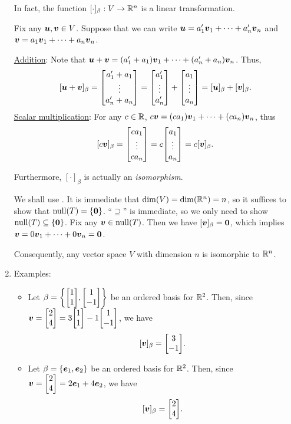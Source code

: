 \begin{enumerate}
In fact, the function \([\cdot]_{\beta}:V\to\mathbb{R}^n\) is a linear transformation.

\begin{pf}
Fix any \(\vb*{u},\vb*{v}\in V\). Suppose that we can write
\(\vb*{u}=a_1'\vb*{v}_1+\dotsb+a_n'\vb*{v}_n\) and
\(\vb*{v}=a_1\vb*{v}_1+\dotsb+a_n\vb*{v}_n\).

\underline{Addition}: Note that
\(\vb*{u}+\vb*{v}=(a_1'+a_1)\vb*{v}_1+\dotsb+(a_n'+a_n)\vb*{v}_n\). Thus,
\[
[\vect{u}+\vect{v}]_{\beta}
=\mqty[
a_1'+a_1\\
\vdots\\
a_n'+a_n
]
=\mqty[
a_1'\\ \vdots\\ a_n'
]
+\mqty[
a_1\\ \vdots\\ a_n
]
=[\vect{u}]_{\beta}+[\vect{v}]_{\beta}.
\]
\underline{Scalar multiplication}: For any \(c\in\mathbb{R}\),
\(c\vb*{v}=(ca_1)\vb*{v}_1+\dotsb+(ca_n)\vb*{v}_n\), thus
\[
[c\vect{v}]_{\beta}=\mqty[ca_1\\ \vdots\\ ca_n]=c\mqty[a_1\\ \vdots\\ a_n]=c[\vect{v}]_{\beta}.
\]
\end{pf}

Furthermore, \([\cdot]_{\beta}\) is actually an
\emph{isomorphism}.

\begin{pf}
We shall use . It is immediate that
\(\dim(V)=\dim(\mathbb{R}^n)=n\), so it suffices to show that \(\operatorname{null}(T)=\{\vb*{0}\}\).
``\(\supseteq\)'' is immediate, so we only need to show \(\operatorname{null}(T)\subseteq
\{\vb*{0}\}\). Fix any \(\vb*{v}\in\operatorname{null}(T)\). Then we have
\([\vb*{v}]_{\beta}=\vb*{0}\), which implies
\(\vb*{v}=0\vb*{v}_1+\dotsb+0\vb*{v}_n=\vb*{0}\).
\end{pf}

Consequently, any vector space \(V\) with dimension \(n\) is isomorphic to
\(\mathbb{R}^n\).

\item Examples:
\begin{itemize}
\item Let \(\beta=\qty{\mqty[1\\ 1], \mqty[1\\ -1]}\) be an ordered basis for
\(\mathbb{R}^2\). Then, since \(\vect{v}=\mqty[2\\4] =3\mqty[1\\ 1]-1\mqty[1\\ -1]\), we have
\[
[\vect{v}]_{\beta}=\mqty[3\\ -1].
\]
\item Let \(\beta=\{\vb*{e}_1,\vb*{e}_2\}\) be an ordered basis for
\(\mathbb{R}^2\). Then, since \(\vect{v}=\mqty[2\\ 4]=2\vect{e}_1+4\vect{e}_2\), we have
\[
[\vect{v}]_{\beta}=\mqty[2\\ 4].
\]


\end{itemize}
\end{enumerate}
